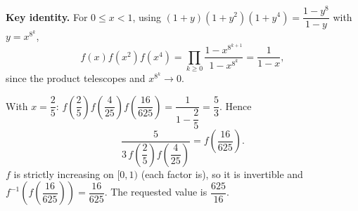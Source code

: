 \textbf{Key identity.} For $0\le x<1$, using $(1+y)(1+y^2)(1+y^4)=\dfrac{1-y^8}{1-y}$ with $y=x^{8^k}$,
\[
f(x)f(x^2)f(x^4)=\prod_{k\ge0}\dfrac{1-x^{8^{k+1}}}{1-x^{8^k}}=\dfrac{1}{1-x},
\]
since the product telescopes and $x^{8^{k}}\to0$.

With $x=\dfrac{2}{5}$: $f\left(\dfrac{2}{5}\right)f\left(\dfrac{4}{25}\right)f\left(\dfrac{16}{625}\right)=\dfrac{1}{1-\dfrac{2}{5}}=\dfrac{5}{3}$. Hence
\[
\dfrac{5}{3\,f\left(\dfrac{2}{5}\right)f\left(\dfrac{4}{25}\right)}=f\left(\dfrac{16}{625}\right).
\]
$f$ is strictly increasing on $[0,1)$ (each factor is), so it is invertible and $f^{-1}\left(f\left(\dfrac{16}{625}\right)\right)=\dfrac{16}{625}$. The requested value is $\boxed{\dfrac{625}{16}}$.
